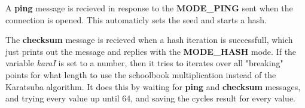 A \textbf{ping} message is recieved in response to the \textbf{MODE\_PING} sent when the connection is opened. This automaticly sets the seed and starts a hash.

The \textbf{checksum} message is recieved when a hash iteration is successfull, which just prints out the message and replies with the \textbf{MODE\_HASH} mode.
\label{karatTesting}
If the variable \textit{karaI} is set to a number, then it tries to iterates over all "breaking" points for what length to use the schoolbook multiplication instead of the Karatsuba algorithm. It does this by waiting for \textbf{ping} and \textbf{checksum} messages, and trying every value up until 64, and saving the cycles result for every value.

\pagebreak